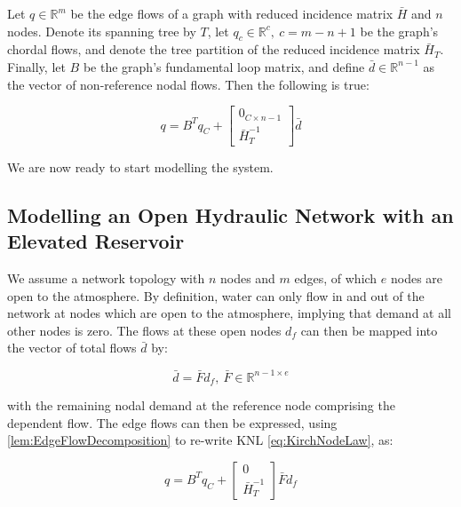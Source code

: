 \begin{lemma}\label{lem:EdgeFlowDecomposition}
	Let $q \in \mathbb{R}^m$ be the edge flows of a graph with reduced incidence matrix $\bar{H}$ and $n$ nodes. Denote its spanning tree by $T$, let $q_c \in \mathbb{R}^c, \ c = m-n+1$ be the graph's chordal flows, and denote the tree partition of the reduced incidence matrix $\bar{H}_T$. Finally, let $B$ be the graph's fundamental loop matrix, and define $\bar{d} \in \mathbb{R}^{n-1}$ as the vector of non-reference nodal flows. Then the following is true:
	
	\begin{equation}\label{eq:EdgeFlowDecomposition}
		q = B^T q_C +
		\begin{bmatrix}
			0_{C \times n-1} \\ \bar{H}_T^{-1} 
		\end{bmatrix}
		 \bar{d}
	\end{equation}
\end{lemma}

We are now ready to start modelling the system.

\subsection{Modelling an Open Hydraulic Network with an Elevated Reservoir}\label{subsec:ModelWithTank}

We assume a network topology with $n$ nodes and $m$ edges, of which $e$ nodes are open to the atmosphere. By definition, water can only flow in and out of the network at nodes which are open to the atmosphere, implying that demand at all other nodes is zero. The flows at these open nodes $d_f$ can then be mapped into the vector of total flows $\bar{d}$ by:

\begin{equation}\label{eq:IndependentFlows}
	\bar{d} = \bar{F} d_f, \ \bar{F} \in \mathbb{R}^{n-1 \times e}
\end{equation}

with the remaining nodal demand at the reference node comprising the dependent flow. The edge flows can then be expressed, using \cref{lem:EdgeFlowDecomposition} to re-write KNL \cref{eq:KirchNodeLaw}, as:

\begin{equation}\label{eq:EdgeFlows}
	q = B^T q_C +
	\begin{bmatrix} 0 \\ \bar{H}_T^{-1} \end{bmatrix} {\bar{F}}  d_f
\end{equation}

